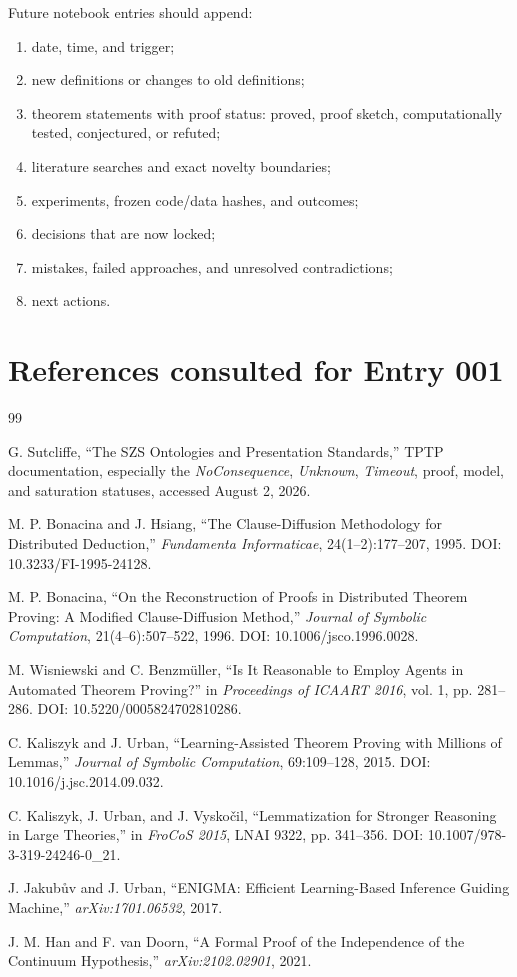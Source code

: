 \documentclass[11pt]{article}
\theoremstyle{definition}
\theoremstyle{remark}
\begin{document}
Future notebook entries should append:
\begin{enumerate}
  \item date, time, and trigger;
  \item new definitions or changes to old definitions;
  \item theorem statements with proof status: proved, proof sketch, computationally tested, conjectured, or refuted;
  \item literature searches and exact novelty boundaries;
  \item experiments, frozen code/data hashes, and outcomes;
  \item decisions that are now locked;
  \item mistakes, failed approaches, and unresolved contradictions;
  \item next actions.
\end{enumerate}

\clearpage
\section*{References consulted for Entry 001}
\begin{thebibliography}{99}

G. Sutcliffe,
``The SZS Ontologies and Presentation Standards,''
TPTP documentation, especially the \emph{NoConsequence}, \emph{Unknown}, \emph{Timeout}, proof, model, and saturation statuses,
accessed August 2, 2026.

M. P. Bonacina and J. Hsiang,
``The Clause-Diffusion Methodology for Distributed Deduction,''
\emph{Fundamenta Informaticae}, 24(1--2):177--207, 1995.
DOI: 10.3233/FI-1995-24128.

M. P. Bonacina,
``On the Reconstruction of Proofs in Distributed Theorem Proving: A Modified Clause-Diffusion Method,''
\emph{Journal of Symbolic Computation}, 21(4--6):507--522, 1996.
DOI: 10.1006/jsco.1996.0028.

M. Wisniewski and C. Benzm\"uller,
``Is It Reasonable to Employ Agents in Automated Theorem Proving?''
in \emph{Proceedings of ICAART 2016}, vol. 1, pp. 281--286.
DOI: 10.5220/0005824702810286.

C. Kaliszyk and J. Urban,
``Learning-Assisted Theorem Proving with Millions of Lemmas,''
\emph{Journal of Symbolic Computation}, 69:109--128, 2015.
DOI: 10.1016/j.jsc.2014.09.032.

C. Kaliszyk, J. Urban, and J. Vysko\v{c}il,
``Lemmatization for Stronger Reasoning in Large Theories,''
in \emph{FroCoS 2015}, LNAI 9322, pp. 341--356.
DOI: 10.1007/978-3-319-24246-0\_21.

J. Jakub\r{u}v and J. Urban,
``ENIGMA: Efficient Learning-Based Inference Guiding Machine,''
\emph{arXiv:1701.06532}, 2017.

J. M. Han and F. van Doorn,
``A Formal Proof of the Independence of the Continuum Hypothesis,''
\emph{arXiv:2102.02901}, 2021.

\end{thebibliography}
\end{document}
